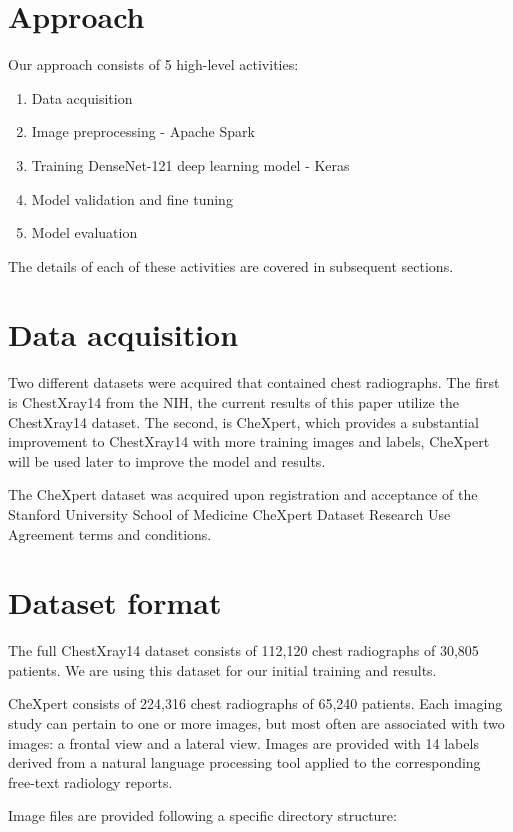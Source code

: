 \documentclass{amia}
\begin{document}
\section*{Approach}

Our approach consists of 5 high-level activities:
\begin{enumerate}
\item Data acquisition
\item Image preprocessing - Apache Spark
\item Training DenseNet-121 deep learning model - Keras
\item Model validation and fine tuning
\item Model evaluation
\end{enumerate}

The details of each of these activities are covered in subsequent sections.

\section*{Data acquisition}
Two different datasets were acquired that contained chest radiographs. The first is ChestXray14 from the NIH, the current results of this paper utilize the ChestXray14 dataset. The second, is CheXpert, which provides a substantial improvement to ChestXray14 with more training images and labels, CheXpert will be used later to improve the model and results.

The CheXpert dataset was acquired upon registration and acceptance of the Stanford University School of Medicine CheXpert Dataset Research Use Agreement terms and conditions.\cite{ref2}

\section*{Dataset format}
The full ChestXray14 dataset consists of 112,120 chest radiographs of 30,805 patients. We are using this dataset for our initial training and results.

CheXpert consists of 224,316 chest radiographs of 65,240 patients. Each imaging study can pertain to one or more images, but most often are associated with two images: a frontal view and a lateral view. Images are provided with 14 labels derived from a natural language processing tool applied to the corresponding free-text radiology reports.

Image files are provided following a specific directory structure:
\end{document}
